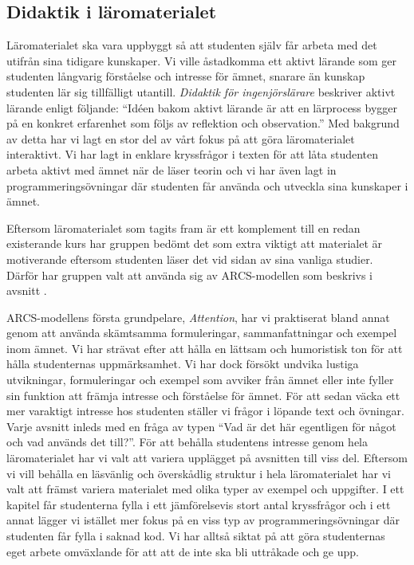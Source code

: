 \documentclass[12pt,a4paper,twoside,openright]{article}
\begin{document}
\subsection{Didaktik i läromaterialet}
\label{sec:matDidaktik}
Läromaterialet ska vara uppbyggt så att studenten själv får arbeta med
det utifrån sina tidigare kunskaper. Vi ville åstadkomma ett aktivt
lärande som ger studenten långvarig förståelse och intresse för ämnet,
snarare än kunskap studenten lär sig tillfälligt
utantill. \textit{Didaktik för ingenjörslärare}
\cite{didaktik_for_ingenjorslarare} beskriver aktivt lärande enligt
följande: ``Idéen bakom aktivt lärande är att en lärprocess bygger på
en konkret erfarenhet som följs av reflektion och observation.'' Med
bakgrund av detta har vi lagt en stor del av vårt fokus på att göra
läromaterialet interaktivt. Vi har lagt in enklare kryssfrågor i
texten för att låta studenten arbeta aktivt med ämnet när de läser
teorin och vi har även lagt in programmeringsövningar där studenten
får använda och utveckla sina kunskaper i ämnet.

Eftersom läromaterialet som tagits fram är ett komplement till en
redan existerande kurs har gruppen bedömt det som extra viktigt att
materialet är motiverande eftersom studenten läser det vid sidan av
sina vanliga studier. Därför har gruppen valt att använda sig av
ARCS-modellen som beskrivs i avsnitt .

ARCS-modellens första grundpelare, \textit{Attention}, har vi
praktiserat bland annat genom att använda skämtsamma formuleringar,
sammanfattningar och exempel inom ämnet. Vi har strävat efter att
hålla en lättsam och humoristisk ton för att hålla studenternas
uppmärksamhet. Vi har dock försökt undvika lustiga utvikningar,
formuleringar och exempel som avviker från ämnet eller inte fyller sin
funktion att främja intresse och förståelse för ämnet. För att sedan
väcka ett mer varaktigt intresse hos studenten ställer vi frågor i
löpande text och övningar. Varje avsnitt inleds med en fråga av typen
``Vad är det här egentligen för något och vad används det till?''. För
att behålla studentens intresse genom hela läromaterialet har vi valt
att variera upplägget på avsnitten till viss del. Eftersom vi vill
behålla en läsvänlig och överskådlig struktur i hela läromaterialet
har vi valt att främst variera materialet med olika typer av exempel
och uppgifter. I ett kapitel får studenterna fylla i ett jämförelsevis
stort antal kryssfrågor och i ett annat lägger vi istället mer fokus
på en viss typ av programmeringsövningar där studenten får fylla i
saknad kod. Vi har alltså siktat på att göra studenternas eget arbete
omväxlande för att att de inte ska bli uttråkade och ge upp.
\end{document}
